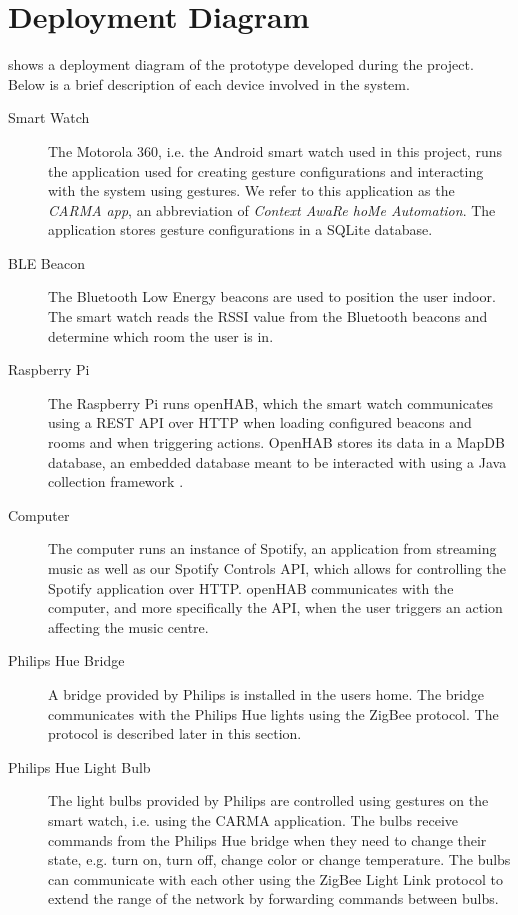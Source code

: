 \section{Deployment Diagram}

 shows a deployment diagram of the prototype developed during the project. Below is a brief description of each device involved in the system.

\begin{description}
\item[Smart Watch] The Motorola 360, i.e. the Android smart watch used in this project, runs the application used for creating gesture configurations and interacting with the system using gestures. We refer to this application as the \emph{CARMA app}, an abbreviation of \emph{Context AwaRe hoMe Automation}. The application stores gesture configurations in a SQLite database.
\item[BLE Beacon] The Bluetooth Low Energy beacons are used to position the user indoor. The smart watch reads the RSSI value from the Bluetooth beacons and determine which room the user is in.
\item[Raspberry Pi] The Raspberry Pi runs openHAB, which the smart watch communicates using a REST API over HTTP when loading configured beacons and rooms and when triggering actions. OpenHAB stores its data in a MapDB database, an embedded database meant to be interacted with using a Java collection framework \cite{mapdb:mapdb}.
\item[Computer] The computer runs an instance of Spotify, an application from streaming music as well as our Spotify Controls API, which allows for controlling the Spotify application over HTTP. openHAB communicates with the computer, and more specifically the API, when the user triggers an action affecting the music centre.
\item[Philips Hue Bridge] A bridge provided by Philips is installed in the users home. The bridge communicates with the Philips Hue lights using the ZigBee protocol. The protocol is described later in this section.
\item[Philips Hue Light Bulb] The light bulbs provided by Philips are controlled using gestures on the smart watch, i.e. using the CARMA application. The bulbs receive commands from the Philips Hue bridge when they need to change their state, e.g. turn on, turn off, change color or change temperature. The bulbs can communicate with each other using the ZigBee Light Link protocol to extend the range of the network by forwarding commands between bulbs.
\end{description}

